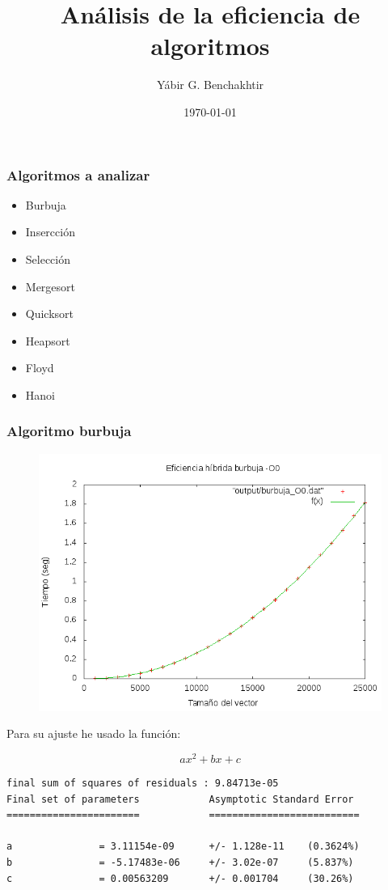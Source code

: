 \documentclass[spanish]{beamer}
\title{Análisis de la eficiencia de algoritmos}
\date{\today}
\author{Yábir G. Benchakhtir}
\institute{Doble Grado en Ingeniería Informática y Matemáticas}
\begin{document}
\frame{\titlepage}

\begin{frame}\frametitle{Algoritmos a analizar}

  \begin{itemize}
  \item Burbuja
  \item Insercción
  \item Selección
  \item Mergesort
  \item Quicksort
  \item Heapsort
  \item Floyd 
  \item Hanoi
  \end{itemize}
\end{frame}

%
%

\begin{frame}\frametitle{Algoritmo burbuja}
  \begin{figure}[H]
    \centering   
        \includegraphics[clip,width=1\columnwidth]{../../plots/burbuja_O0_fit.png}%
    \end{figure}
  \end{frame}

\begin{frame}[fragile]
  Para su ajuste he usado la función:

  $$ax^2+bx+c$$
\scriptsize
\begin{verbatim}
final sum of squares of residuals : 9.84713e-05
Final set of parameters            Asymptotic Standard Error
=======================            ==========================

a               = 3.11154e-09      +/- 1.128e-11    (0.3624%)
b               = -5.17483e-06     +/- 3.02e-07     (5.837%)
c               = 0.00563209       +/- 0.001704     (30.26%)
\end{verbatim}
  
\end{frame}
\end{document}
